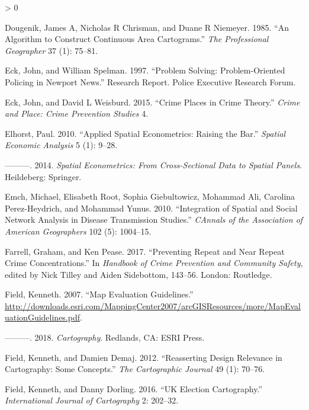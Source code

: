 \documentclass[
  krantz2]{krantz}
\newlength{\cslhangindent}
\newenvironment{CSLReferences}[2] %
 {%
  \setlength{\parindent}{0pt}
  \ifodd #1 \everypar{\setlength{\hangindent}{\cslhangindent}}\ignorespaces\fi
  \ifnum #2 > 0
  \setlength{\parskip}{#2\baselineskip}
  \fi
 }%
 {}
\begin{document}
\begin{CSLReferences}{1}{0}
\leavevmode\hypertarget{ref-Dougenik_1985}{}%
Dougenik, James A, Nicholas R Chrisman, and Duane R Niemeyer. 1985. {``An Algorithm to Construct Continuous Area Cartograms.''} \emph{The Professional Geographer} 37 (1): 75--81.

\leavevmode\hypertarget{ref-Eck_1997}{}%
Eck, John, and William Spelman. 1997. {``Problem Solving: Problem-Oriented Policing in Newport News.''} Research Report. Police Executive Research Forum.

\leavevmode\hypertarget{ref-Eck_2015}{}%
Eck, John, and David L Weisburd. 2015. {``Crime Places in Crime Theory.''} \emph{Crime and Place: Crime Prevention Studies} 4.

\leavevmode\hypertarget{ref-Elhorst_2010}{}%
Elhorst, Paul. 2010. {``Applied Spatial Econometrics: Raising the Bar.''} \emph{Spatial Economic Analysis} 5 (1): 9--28.

\leavevmode\hypertarget{ref-Elhorst_2014}{}%
---------. 2014. \emph{Spatial Econometrics: From Cross-Sectional Data to Spatial Panels}. Heildeberg: Springer.

\leavevmode\hypertarget{ref-Emch_2010}{}%
Emch, Michael, Elisabeth Root, Sophia Giebultowicz, Mohammad Ali, Carolina Perez-Heydrich, and Mohammad Yunus. 2010. {``Integration of Spatial and Social Network Analysis in Disease Transmission Studies.''} \emph{CAnnals of the Association of American Geographers} 102 (5): 1004--15.

\leavevmode\hypertarget{ref-Farrell_2017}{}%
Farrell, Graham, and Ken Pease. 2017. {``Preventing Repeat and Near Repeat Crime Concentrations.''} In \emph{Handbook of Crime Prevention and Community Safety}, edited by Nick Tilley and Aiden Sidebottom, 143--56. London: Routledge.

\leavevmode\hypertarget{ref-Field_2007}{}%
Field, Kenneth. 2007. {``Map Evaluation Guidelines.''} \url{http://downloads.esri.com/MappingCenter2007/arcGISResources/more/MapEvaluationGuidelines.pdf}.

\leavevmode\hypertarget{ref-Field_2018}{}%
---------. 2018. \emph{Cartography}. Redlands, CA: ESRI Press.

\leavevmode\hypertarget{ref-Field_2012}{}%
Field, Kenneth, and Damien Demaj. 2012. {``Reasserting Design Relevance in Cartography: Some Concepts.''} \emph{The Cartographic Journal} 49 (1): 70--76.

\leavevmode\hypertarget{ref-Field_2016}{}%
Field, Kenneth, and Danny Dorling. 2016. {``UK Election Cartography.''} \emph{International Journal of Cartography} 2: 202--32.


\end{CSLReferences}
\end{document}
